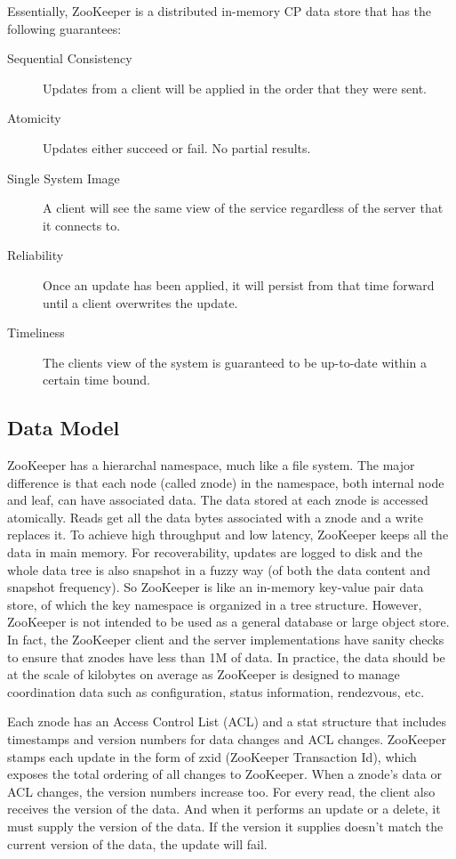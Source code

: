 \documentclass[11pt]{book}
\begin{document}
Essentially, ZooKeeper is a distributed in-memory CP data store that has the following guarantees:
\begin{description}
\item[Sequential Consistency] Updates from a client will be applied in the order that they were sent.
\item[Atomicity] Updates either succeed or fail. No partial results.
\item[Single System Image] A client will see the same view of the service regardless of the server that it connects to.
\item[Reliability] Once an update has been applied, it will persist from that time forward until a client overwrites the update.
\item[Timeliness] The clients view of the system is guaranteed to be up-to-date within a certain time bound.
\end{description}

\subsection{Data Model}
ZooKeeper has a hierarchal namespace, much like a file system. The major difference is that each node (called znode) in the namespace, both internal node and leaf, can have associated data. The data stored at each znode is accessed atomically. Reads get all the data bytes associated with a znode and a write replaces it. To achieve high throughput and low latency, ZooKeeper keeps all the data in main memory. For recoverability, updates are logged to disk and the whole data tree is also snapshot in a fuzzy way (of both the data content and snapshot frequency). So ZooKeeper is like an in-memory key-value pair data store, of which the key namespace is organized in a tree structure. However, ZooKeeper is not intended to be used as a general database or large object store. In fact, the ZooKeeper client and the server implementations have sanity checks to ensure that znodes have less than 1M of data. In practice, the data should be at the scale of kilobytes on average as ZooKeeper is designed to manage coordination data such as configuration, status information, rendezvous, etc. 

Each znode has an Access Control List (ACL) and a stat structure that includes timestamps and version numbers for data changes and ACL changes. ZooKeeper stamps each update in the form of zxid (ZooKeeper Transaction Id), which exposes the total ordering of all changes to ZooKeeper. When a znode's data or ACL changes, the version numbers increase too. For every read, the client also receives the version of the data. And when it performs an update or a delete, it must supply the version of the data. If the version it supplies doesn't match the current version of the data, the update will fail.
\end{document}
